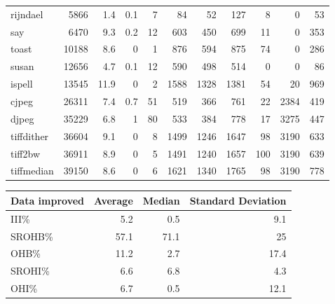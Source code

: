 \begin{tabular}{lrrrrrrrrrr}
 rijndael        &           5866 &      1.4 &    0.1 &    7 &     84 &         52 &          127 &     8 &     0 &    53 \\
 say             &           6470 &      9.3 &    0.2 &   12 &    603 &        450 &          699 &    11 &     0 &   353 \\
 toast           &          10188 &      8.6 &    0   &    1 &    876 &        594 &          875 &    74 &     0 &   286 \\
 susan           &          12656 &      4.7 &    0.1 &   12 &    590 &        498 &          514 &     0 &     0 &    86 \\
 ispell          &          13545 &     11.9 &    0   &    2 &   1588 &       1328 &         1381 &    54 &    20 &   969 \\
 cjpeg           &          26311 &      7.4 &    0.7 &   51 &    519 &        366 &          761 &    22 &  2384 &   419 \\
 djpeg           &          35229 &      6.8 &    1   &   80 &    533 &        384 &          778 &    17 &  3275 &   447 \\
 tiffdither      &          36604 &      9.1 &    0   &    8 &   1499 &       1246 &         1647 &    98 &  3190 &   633 \\
 tiff2bw         &          36911 &      8.9 &    0   &    5 &   1491 &       1240 &         1657 &   100 &  3190 &   639 \\
 tiffmedian      &          39150 &      8.6 &    0   &    6 &   1621 &       1340 &         1765 &    98 &  3190 &   778 \\
\hline
\end{tabular}\begin{tabular}{lrrr}
\hline
 Data improved   &   Average &   Median &   Standard Deviation \\
\hline
 III\%            &       5.2 &      0.5 &                  9.1 \\
 SROHB\%          &      57.1 &     71.1 &                 25   \\
 OHB\%            &      11.2 &      2.7 &                 17.4 \\
 SROHI\%          &       6.6 &      6.8 &                  4.3 \\
 OHI\%            &       6.7 &      0.5 &                 12.1 \\
\hline
\end{tabular}